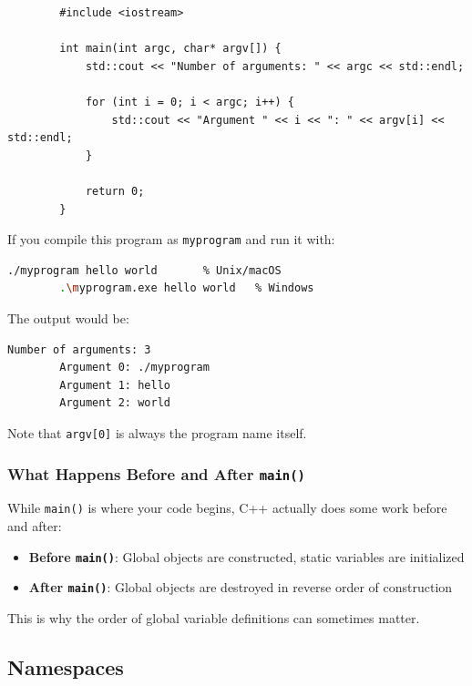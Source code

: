 \begin{example}{\leavevmode}
	
	\begin{lstlisting}
		#include <iostream>
		
		int main(int argc, char* argv[]) {
			std::cout << "Number of arguments: " << argc << std::endl;
			
			for (int i = 0; i < argc; i++) {
				std::cout << "Argument " << i << ": " << argv[i] << std::endl;
			}
			
			return 0;
		}
	\end{lstlisting}
	
	If you compile this program as \texttt{myprogram} and run it with:
	\begin{lstlisting}[language=bash,numbers=none]
		./myprogram hello world       % Unix/macOS
		.\myprogram.exe hello world   % Windows
	\end{lstlisting}

	The output would be:
	\begin{lstlisting}[numbers=none]
		Number of arguments: 3
		Argument 0: ./myprogram
		Argument 1: hello
		Argument 2: world
	\end{lstlisting}

	Note that \texttt{argv[0]} is always the program name itself.
\end{example}

\subsubsection{What Happens Before and After \texttt{main()}}

While \texttt{main()} is where your code begins, C++ actually does some work before and after:

\begin{itemize}
	\item \textbf{Before \texttt{main()}}: Global objects are constructed, static variables are initialized
	\item \textbf{After \texttt{main()}}: Global objects are destroyed in reverse order of construction
\end{itemize}

This is why the order of global variable definitions can sometimes matter.

\subsection{Namespaces}

